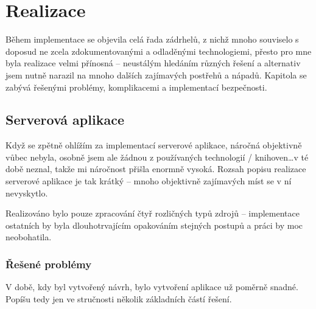 
\chapter{Realizace}
Během implementace se objevila celá řada zádrhelů, z nichž mnoho souviselo s doposud ne zcela zdokumentovanými a odladěnými technologiemi, přesto pro mne byla realizace velmi přínosná -- neustálým hledáním různých řešení a alternativ jsem nutně narazil na mnoho dalších zajímavých postřehů a nápadů. Kapitola se zabývá řešenými problémy, komplikacemi a implementací bezpečnosti. %

\section{Serverová aplikace}
Když se zpětně ohlížím za implementací serverové aplikace, náročná objektivně vůbec nebyla, osobně jsem ale žádnou z používaných technologií / knihoven\dots v té době neznal, takže mi náročnost přišla enormně vysoká. Rozsah popisu realizace serverové aplikace je tak krátký -- mnoho objektivně zajímavých míst se v ní nevyskytlo.

Realizováno bylo pouze zpracování čtyř rozličných typů zdrojů -- implementace ostatních by byla dlouhotrvajícím opakováním stejných postupů a práci by moc neobohatila.

\subsection{Řešené problémy}
V době, kdy byl vytvořený návrh, bylo vytvoření aplikace už poměrně snadné. Popíšu tedy jen ve stručnosti několik základních částí řešení.

